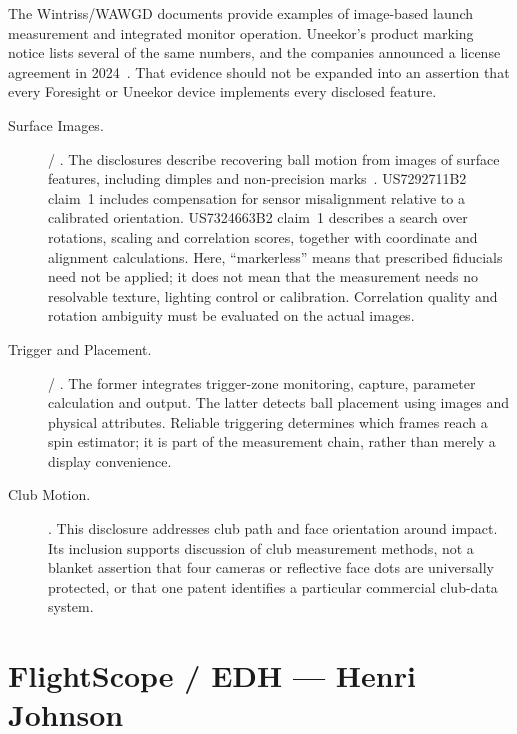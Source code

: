 The Wintriss/WAWGD documents provide examples of image-based launch measurement and integrated monitor operation.
Uneekor's product marking notice lists several of the same numbers, and the companies announced a license agreement in 2024~\cite{uneekorpatents,businesswireforesight}.
That evidence should not be expanded into an assertion that every Foresight or Uneekor device implements every disclosed feature.

\begin{description}
\item[Surface Images.]
 / .
The disclosures describe recovering ball motion from images of surface
features, including dimples and non-precision marks~\cite{us7292711}.
US7292711B2 claim~1 includes compensation for sensor misalignment relative
to a calibrated orientation. US7324663B2 claim~1 describes a search over
rotations, scaling and correlation scores, together with coordinate and
alignment calculations. Here, ``markerless'' means that prescribed
fiducials need not be applied; it does not mean that the measurement needs
no resolvable texture, lighting control or calibration. Correlation
quality and rotation ambiguity must be evaluated on the actual images.
\item[Trigger and Placement.]
 / .
The former integrates trigger-zone monitoring, capture, parameter
calculation and output. The latter detects ball placement using images
and physical attributes. Reliable triggering determines which frames
reach a spin estimator; it is part of the measurement chain, rather than
merely a display convenience.
\item[Club Motion.]
.
This disclosure addresses club path and face orientation around impact.
Its inclusion supports discussion of club measurement methods, not a
blanket assertion that four cameras or reflective face dots are
universally protected, or that one patent identifies a particular
commercial club-data system.
\end{description}

\section{FlightScope / EDH --- Henri Johnson}
\label{sec:patentflightscope}

